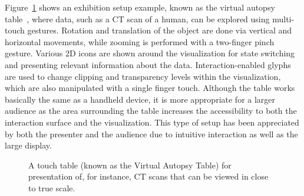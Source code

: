 \documentclass[review,journal]{vgtc}         %
\begin{document}
Figure~\ref{img:exhibition_table} shows an exhibition setup example, known as the virtual autopsy table~\cite{LRFPY11}, where data, such as a CT scan of a human, can be explored using multi-touch gestures.
Rotation and translation of the object are done via vertical and horizontal movements, while zooming is performed with a two-finger pinch gesture.
Various 2D icons are shown around the visualization for state switching and presenting relevant information about the data.
Interaction-enabled glyphs are used to change clipping and transparency levels within the visualization, which are also manipulated with a single finger touch.
Although the table works basically the same as a handheld device, it is more appropriate for a larger audience as the area surrounding the table increases the accessibility to both the interaction surface and the visualization. This type of setup has been appreciated by both the presenter and the audience due to intuitive interaction as well as the large display.


\begin{figure}[htb]
	\centering
	\caption{A touch table (known as the Virtual Autopsy Table) for presentation of, for instance, CT scans that can be viewed in close to true scale.}
	\label{img:exhibition_table}
\end{figure}
\end{document}
